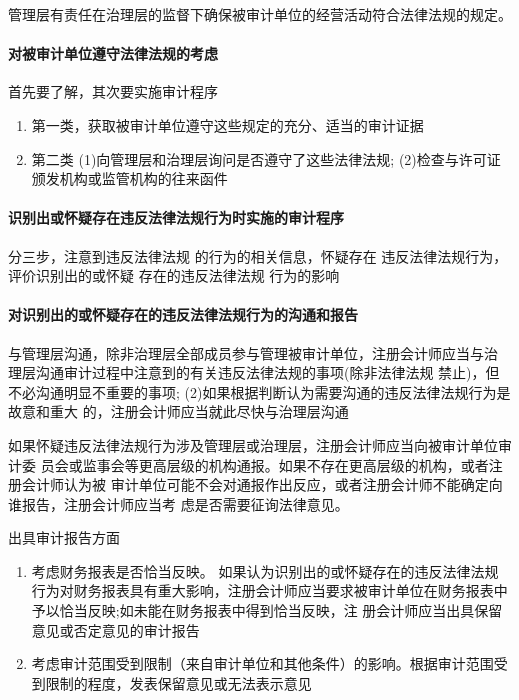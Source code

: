 \documentclass[UTF8,12pt]{ctexart}
\numberwithin{equation}{section} %
\numberwithin{figure}{section}
\numberwithin{table}{section}
\begin{document}
	管理层有责任在治理层的监督下确保被审计单位的经营活动符合法律法规的规定。
	
	\paragraph{对被审计单位遵守法律法规的考虑}
	首先要了解，其次要实施审计程序
	\begin{enumerate}
		\item 第一类，获取被审计单位遵守这些规定的充分、适当的审计证据
		
		\item 第二类
		(1)向管理层和治理层询问是否遵守了这些法律法规; (2)检查与许可证颁发机构或监管机构的往来函件
	\end{enumerate}
	
	
	
	\paragraph{识别出或怀疑存在违反法律法规行为时实施的审计程序}
	分三步，注意到违反法律法规 的行为的相关信息，怀疑存在 违反法律法规行为，评价识别出的或怀疑 存在的违反法律法规 行为的影响
	
	\paragraph{对识别出的或怀疑存在的违反法律法规行为的沟通和报告}
	
	与管理层沟通，除非治理层全部成员参与管理被审计单位，注册会计师应当与治 理层沟通审计过程中注意到的有关违反法律法规的事项(除非法律法规 禁止)，但不必沟通明显不重要的事项; (2)如果根据判断认为需要沟通的违反法律法规行为是故意和重大 的，注册会计师应当就此尽快与治理层沟通
	
	如果怀疑违反法律法规行为涉及管理层或治理层，注册会计师应当向被审计单位审计委 员会或监事会等更高层级的机构通报。如果不存在更高层级的机构，或者注册会计师认为被 审计单位可能不会对通报作出反应，或者注册会计师不能确定向谁报告，注册会计师应当考 虑是否需要征询法律意见。
	
	出具审计报告方面
	\begin{enumerate}
		\item 考虑财务报表是否恰当反映。 如果认为识别出的或怀疑存在的违反法律法规行为对财务报表具有重大影响，注册会计师应当要求被审计单位在财务报表中予以恰当反映;如未能在财务报表中得到恰当反映，注 册会计师应当出具保留意见或否定意见的审计报告
		
		\item 考虑审计范围受到限制（来自审计单位和其他条件）的影响。根据审计范围受到限制的程度，发表保留意见或无法表示意见
	\end{enumerate}
	
\end{document}
